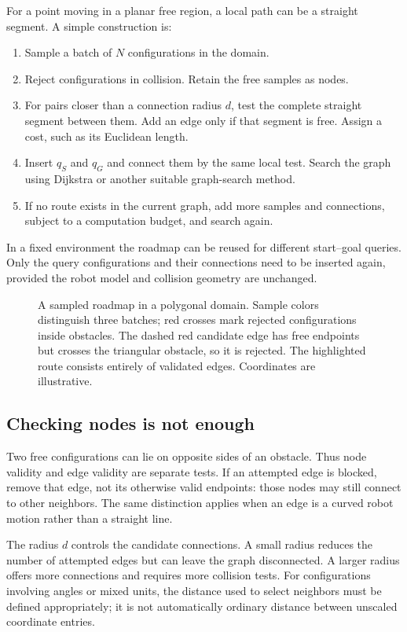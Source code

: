 For a point moving in a planar free region, a local path can be a straight
segment. A simple construction is:
\begin{enumerate}
\item Sample a batch of $N$ configurations in the domain.
\item Reject configurations in collision. Retain the free samples as nodes.
\item For pairs closer than a connection radius $d$, test the complete
straight segment between them. Add an edge only if that segment is free.
Assign a cost, such as its Euclidean length.
\item Insert $q_S$ and $q_G$ and connect them by the same local test.
Search the graph using Dijkstra or another suitable graph-search method.
\item If no route exists in the current graph, add more samples and
connections, subject to a computation budget, and search again.
\end{enumerate}
In a fixed environment the roadmap can be reused for different start--goal
queries. Only the query configurations and their connections need to be
inserted again, provided the robot model and collision geometry are unchanged.

\begin{figure}[htbp]
\centering
\caption{A sampled roadmap in a polygonal domain. Sample colors distinguish
three batches; red crosses mark rejected configurations inside obstacles.
The dashed red candidate edge has free endpoints but crosses the triangular
obstacle, so it is rejected. The highlighted route consists entirely of
validated edges. Coordinates are illustrative.}
\label{fig:l13-prm}
\end{figure}

\subsection{Checking nodes is not enough}
Two free configurations can lie on opposite sides of an obstacle. Thus
node validity and edge validity are separate tests. If an attempted edge
is blocked, remove that edge, not its otherwise valid endpoints: those
nodes may still connect to other neighbors. The same distinction applies
when an edge is a curved robot motion rather than a straight line.

The radius $d$ controls the candidate connections. A small radius reduces
the number of attempted edges but can leave the graph disconnected.
A larger radius offers more connections and requires more collision tests.
For configurations involving angles or mixed units, the distance used to
select neighbors must be defined appropriately; it is not automatically
ordinary distance between unscaled coordinate entries.

